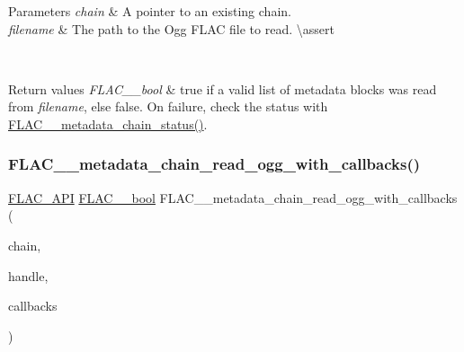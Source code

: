 \begin{DoxyParams}{Parameters}
{\em chain} & A pointer to an existing chain. \\
\hline
{\em filename} & The path to the Ogg F\+L\+AC file to read. \textbackslash{}assert 
\begin{DoxyCode}{1}
\end{DoxyCode}
 
\begin{DoxyCode}{1}
\end{DoxyCode}
 \\
\hline
\end{DoxyParams}

\begin{DoxyRetVals}{Return values}
{\em F\+L\+A\+C\+\_\+\+\_\+bool} & {\ttfamily true} if a valid list of metadata blocks was read from {\itshape filename}, else {\ttfamily false}. On failure, check the status with \mbox{\hyperlink{group__flac__metadata__level2_ga3d030e216a6517f23372bb76f0639127}{F\+L\+A\+C\+\_\+\+\_\+metadata\+\_\+chain\+\_\+status()}}. \\
\hline
\end{DoxyRetVals}
\mbox{\label{group__flac__metadata__level2_ga62c24f8d127897e5b7d00aa48f889996}} 
\subsubsection{\texorpdfstring{FLAC\_\_metadata\_chain\_read\_ogg\_with\_callbacks()}{FLAC\_\_metadata\_chain\_read\_ogg\_with\_callbacks()}}
{\footnotesize\ttfamily \mbox{\hyperlink{group__flac__export_ga56ca07df8a23310707732b1c0007d6f5}{F\+L\+A\+C\+\_\+\+A\+PI}} \mbox{\hyperlink{ordinals_8h_a95103469f1cbd78b8cf250194985b34e}{F\+L\+A\+C\+\_\+\+\_\+bool}} F\+L\+A\+C\+\_\+\+\_\+metadata\+\_\+chain\+\_\+read\+\_\+ogg\+\_\+with\+\_\+callbacks (\begin{DoxyParamCaption}\item[{\mbox{\hyperlink{group__flac__metadata__level2_gaec6993c60b88f222a52af86f8f47bfdf}{F\+L\+A\+C\+\_\+\+\_\+\+Metadata\+\_\+\+Chain}} $\ast$}]{chain,  }\item[{\mbox{\hyperlink{group__flac__callbacks_ga4c329c3168dee6e352384c5e9306260d}{F\+L\+A\+C\+\_\+\+\_\+\+I\+O\+Handle}}}]{handle,  }\item[{\mbox{\hyperlink{struct_f_l_a_c_____i_o_callbacks}{F\+L\+A\+C\+\_\+\+\_\+\+I\+O\+Callbacks}}}]{callbacks }\end{DoxyParamCaption})}

